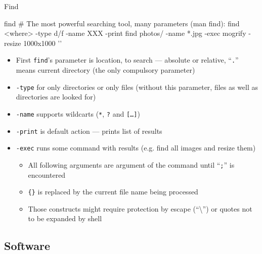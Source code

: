 \documentclass[hyperref={bookmarks=true, unicode=true, colorlinks=true, pdftitle={Linux, command line and MetaCentrum}, plainpages=false, pdfauthor={Vojtech Zeisek}, pdfsubject={Course about use of Linux command line, writing shell scripts and using MetaCentrum of CESNET}, pdfcreator={XeLaTeX, http://www.xelatex.org/}, pdfkeywords={Linux, GNU, BASH, shell, command line, MetaCentrum}, linkcolor=Sienna, anchorcolor=black, citecolor=green, filecolor=magenta, menucolor=Sienna, urlcolor=cyan, pdftex}, compress, ucs, xelatex, xcolor=svgnames, 11pt]{beamer}
\begin{document}
\begin{frame}[fragile]{Find}
  \begin{bashcode}
    find # The most powerful searching tool, many parameters (man find):
    find <where> -type d/f -name XXX -print
    find photos/ -name *.jpg -exec mogrify -resize 1000x1000 '{}' \;
  \end{bashcode}
  \begin{itemize}
    \item First \texttt{find}'s parameter is location, to search --- absolute or relative, ``\texttt{.}'' means current directory (the only compulsory parameter)
    \item \texttt{-type} for only directories or only files (without this parameter, files as well as directories are looked for)
    \item \texttt{-name} supports wildcarts (\texttt{*}, \texttt{?} and \texttt{[\ldots]})
    \item \texttt{-print} is default action --- prints list of results
    \item \texttt{-exec} runs some command with results (e.g. find all images and resize them)
    \begin{itemize}
      \item All following arguments are argument of the command until ``\texttt{;}'' is encountered
      \item \texttt{\{\}} is replaced by the current file name being processed
      \item Those constructs might require protection by escape (``\textbackslash'') or quotes not to be expanded by shell
    \end{itemize}
  \end{itemize}
\end{frame}

\subsection{Software}
\end{document}

